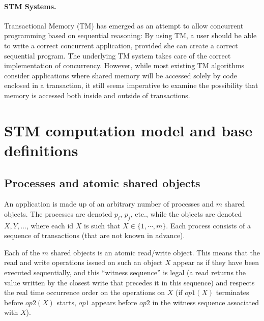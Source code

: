\paragraph{STM Systems.}
Transactional Memory (TM) \cite{herlihy93,shavit95} has  emerged  as  an  attempt  to allow  concurrent  programming  based  
on sequential reasoning:  By  using  TM,  a  user  should  be able  to  write  a  correct  concurrent application, provided she can  
create a correct  sequential program. The underlying TM  system takes care of  the correct  implementation of  concurrency.  
However,  while most existing  TM algorithms consider applications  where  shared  memory  will  be  accessed  solely by  code  
enclosed  in a transaction,  it still seems   imperative to  examine the  possibility that memory is accessed both inside and outside 
of transactions.















\section{STM computation model and base definitions}
\label{sec:model-and-conditions}



\subsection{Processes  and atomic shared objects}
An application is made up of  an  arbitrary number  of  processes  and  $m$
shared  objects.  The processes are denoted $p_i$, $p_j$, etc., 
while the  objects are  denoted $X,Y,\ldots$, where each id $X$ is such 
that $X \in \{1,\cdots,m\}$.   Each process consists of  a sequence of 
transactions (that are not known in advance).

Each of the $m$ shared objects is an atomic read/write object. 
This means  that the read and  write operations issued on  such an  object
$X$  appear as  if they have  been executed  sequentially, and this 
``witness sequence'' is  legal (a read returns the value written by the  
closest write  that precedes it in this sequence) and respects the real time 
occurrence  order on the operations on $X$ (if  $op1(X)$  terminates  before
$op2(X)$  starts, $op1$ appears before $op2$ in the witness sequence 
associated with $X$). 




